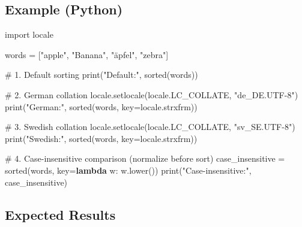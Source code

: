 \documentclass[
  letterpaper,
  DIV=11,
  numbers=noendperiod]{scrreprt}
\newenvironment{Shaded}{\begin{snugshade}}{\end{snugshade}}
\newcommand{\BuiltInTok}[1]{\textcolor[rgb]{0.00,0.23,0.31}{#1}}
\newcommand{\CommentTok}[1]{\textcolor[rgb]{0.37,0.37,0.37}{#1}}
\newcommand{\ImportTok}[1]{\textcolor[rgb]{0.00,0.46,0.62}{#1}}
\newcommand{\KeywordTok}[1]{\textcolor[rgb]{0.00,0.23,0.31}{\textbf{#1}}}
\newcommand{\NormalTok}[1]{\textcolor[rgb]{0.00,0.23,0.31}{#1}}
\newcommand{\OperatorTok}[1]{\textcolor[rgb]{0.37,0.37,0.37}{#1}}
\newcommand{\StringTok}[1]{\textcolor[rgb]{0.13,0.47,0.30}{#1}}
\begin{document}
\subsection{Example (Python)}\label{example-python-5}

\begin{Shaded}
\begin{Highlighting}[]
\ImportTok{import}\NormalTok{ locale}

\NormalTok{words }\OperatorTok{=}\NormalTok{ [}\StringTok{"apple"}\NormalTok{, }\StringTok{"Banana"}\NormalTok{, }\StringTok{"äpfel"}\NormalTok{, }\StringTok{"zebra"}\NormalTok{]}

\CommentTok{\# 1. Default sorting}
\BuiltInTok{print}\NormalTok{(}\StringTok{"Default:"}\NormalTok{, }\BuiltInTok{sorted}\NormalTok{(words))}

\CommentTok{\# 2. German collation}
\NormalTok{locale.setlocale(locale.LC\_COLLATE, }\StringTok{"de\_DE.UTF{-}8"}\NormalTok{)}
\BuiltInTok{print}\NormalTok{(}\StringTok{"German:"}\NormalTok{, }\BuiltInTok{sorted}\NormalTok{(words, key}\OperatorTok{=}\NormalTok{locale.strxfrm))}

\CommentTok{\# 3. Swedish collation}
\NormalTok{locale.setlocale(locale.LC\_COLLATE, }\StringTok{"sv\_SE.UTF{-}8"}\NormalTok{)}
\BuiltInTok{print}\NormalTok{(}\StringTok{"Swedish:"}\NormalTok{, }\BuiltInTok{sorted}\NormalTok{(words, key}\OperatorTok{=}\NormalTok{locale.strxfrm))}

\CommentTok{\# 4. Case{-}insensitive comparison (normalize before sort)}
\NormalTok{case\_insensitive }\OperatorTok{=} \BuiltInTok{sorted}\NormalTok{(words, key}\OperatorTok{=}\KeywordTok{lambda}\NormalTok{ w: w.lower())}
\BuiltInTok{print}\NormalTok{(}\StringTok{"Case{-}insensitive:"}\NormalTok{, case\_insensitive)}
\end{Highlighting}
\end{Shaded}

\subsection{Expected Results}\label{expected-results-6}
\end{document}
